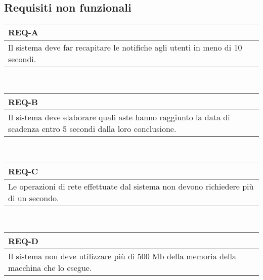         \subsection{Requisiti non funzionali}
        \begin{tabular}{|p{}|}
            \hline
            \multicolumn{1}{|l|}{\cellcolor{head}\textbf{REQ-A}} \\
            \hline
            Il sistema deve far recapitare le notifiche agli utenti in meno di 10 secondi. \\
            \hline
        \end{tabular} \smallskip \\
        \begin{tabular}{|p{}|}
            \hline
            \multicolumn{1}{|l|}{\cellcolor{head}\textbf{REQ-B}} \\
            \hline
            Il sistema deve elaborare quali aste hanno raggiunto la data di scadenza entro 5 secondi dalla loro conclusione. \\
            \hline
        \end{tabular} \smallskip \\
        \begin{tabular}{|p{}|}
            \hline
            \multicolumn{1}{|l|}{\cellcolor{head}\textbf{REQ-C}} \\
            \hline
            Le operazioni di rete effettuate dal sistema non devono richiedere più di un secondo. \\
            \hline
        \end{tabular} \smallskip \\
        \begin{tabular}{|p{}|}
            \hline
            \multicolumn{1}{|l|}{\cellcolor{head}\textbf{REQ-D}} \\
            \hline
            Il sistema non deve utilizzare più di 500 Mb della memoria della macchina che lo esegue. \\
            \hline
        \end{tabular} \smallskip \\
        